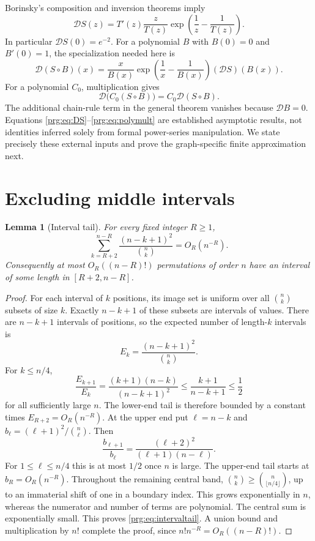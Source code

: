 \documentclass[11pt,letterpaper]{article}
\numberwithin{equation}{section}
\newtheorem{lemma}[theorem]{Lemma}
\theoremstyle{definition}\newtheorem{definition}[theorem]{Definition}
\theoremstyle{remark}\newtheorem{remark}[theorem]{Remark}
\begin{document}
Borinsky's composition and inversion theorems
\cite[Theorem 35 and equations (62)--(67)]{Borinsky} imply
\begin{equation}\label{prg:eq:DS}
 \mathcal D S(z)=T'(z)\frac{z}{T(z)}
             \exp\left(\frac1z-\frac1{T(z)}\right).
\end{equation}
In particular $\mathcal D S(0)=e^{-2}$. For a polynomial $B$ with
$B(0)=0$ and $B'(0)=1$, the specialization needed here is
\begin{equation}\label{prg:eq:composition}
 \mathcal D(S\circ B)(x)=\frac{x}{B(x)}
  \exp\left(\frac1x-\frac1{B(x)}\right)(\mathcal D S)(B(x)).
\end{equation}
For a polynomial $C_0$, multiplication gives
\begin{equation}\label{prg:eq:polymult}
 \mathcal D\bigl(C_0(S\circ B)\bigr)=C_0\mathcal D(S\circ B).
\end{equation}
The additional chain-rule term in the general theorem vanishes
because $\mathcal D B=0$. Equations \eqref{prg:eq:DS}--\eqref{prg:eq:polymult}
are established asymptotic results, not identities inferred solely
from formal power-series manipulation. We state precisely these
external inputs and prove the graph-specific finite approximation
next.

\section{Excluding middle intervals}\label{prg:sec:intervals}

\begin{lemma}[Interval tail]\label{prg:lem:intervals}
For every fixed integer $R\geq1$,
\begin{equation}\label{prg:eq:intervaltail}
 \sum_{k=R+2}^{n-R}\frac{(n-k+1)^2}{\binom nk}=O_R(n^{-R}).
\end{equation}
Consequently at most $O_R((n-R)!)$ permutations of order $n$
have an interval of some length in $[R+2,n-R]$.
\end{lemma}
\begin{proof}
For each interval of $k$ positions, its image set is uniform over
all $\binom nk$ subsets of size $k$. Exactly $n-k+1$ of these
subsets are intervals of values. There are $n-k+1$ intervals of
positions, so the expected number of length-$k$ intervals is
\[
 E_k=\frac{(n-k+1)^2}{\binom nk}.
\]
For $k\leq n/4$,
\[
 \frac{E_{k+1}}{E_k}
 =\frac{(k+1)(n-k)}{(n-k+1)^2}
 \leq\frac{k+1}{n-k+1}\leq\frac12
\]
for all sufficiently large $n$. The lower-end tail is therefore
bounded by a constant times $E_{R+2}=O_R(n^{-R})$.
At the upper end put $\ell=n-k$ and
$b_\ell=(\ell+1)^2/\binom n\ell$. Then
\[
 \frac{b_{\ell+1}}{b_\ell}
 =\frac{(\ell+2)^2}{(\ell+1)(n-\ell)}.
\]
For $1\leq\ell\leq n/4$ this is at most $1/2$ once $n$ is large.
The upper-end tail starts at $b_R=O_R(n^{-R})$.
Throughout the remaining central band,
$\binom nk\geq\binom n{\lfloor n/4\rfloor}$, up to an immaterial
shift of one in a boundary index. This grows exponentially in $n$,
whereas the numerator and number of terms are polynomial. The
central sum is exponentially small. This proves
\eqref{prg:eq:intervaltail}. A union bound and multiplication by $n!$
complete the proof, since $n!n^{-R}=O_R((n-R)!)$.
\end{proof}
\end{document}
